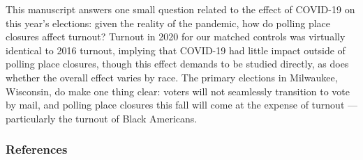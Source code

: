 \documentclass[
  12pt,
]{article}
\begin{document}
This manuscript answers one small question related to the effect of COVID-19 on this year's elections: given the reality of the pandemic, how do polling place closures affect turnout? Turnout in 2020 for our matched controls was virtually identical to 2016 turnout, implying that COVID-19 had little impact outside of polling place closures, though this effect demands to be studied directly, as does whether the overall effect varies by race. The primary elections in Milwaukee, Wisconsin, do make one thing clear: voters will not seamlessly transition to vote by mail, and polling place closures this fall will come at the expense of turnout --- particularly the turnout of Black Americans.

\newpage

\hypertarget{references}{%
\subsubsection*{References}\label{references}}
\end{document}
